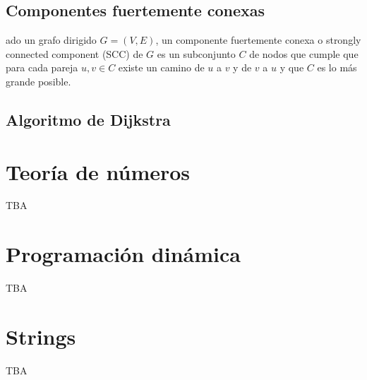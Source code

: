 \documentclass[10pt,letterpaper,twocolumn]{article}
\newcommand{\source}[1]{
	
	\dotfill
}
\begin{document}
	\subsection{Componentes fuertemente conexas}
	
	ado un grafo dirigido $G = (V, E)$, un componente fuertemente conexa o strongly connected component (SCC) de $G$ es un subconjunto $C$ de nodos que cumple que para cada pareja $u, v \in C$ existe un camino de $u$ a $v$ y de $v$ a $u$ y que $C$ es lo más grande posible. 
		\source{./src/componentes_conexas.cpp}
	
	\subsection{Algoritmo de Dijkstra}
		\source{./src/dijkstra.cpp}
	
\section{Teoría de números}
	TBA	
	
\section{Programación dinámica}
	TBA
	
\section{Strings}
	TBA
\end{document}
